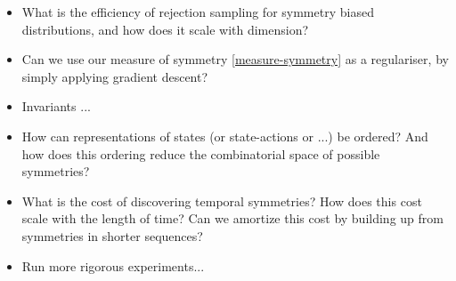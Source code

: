 \begin{itemize}
	\tightlist
	\item What is the efficiency of rejection sampling for symmetry biased distributions, and how does it scale with dimension?
	\item Can we use our measure of symmetry \ref{measure-symmetry} as a regulariser, by simply applying gradient descent?
	\item Invariants ...
	\item How can representations of states (or state-actions or ...) be ordered? And how does this ordering reduce the combinatorial space of possible symmetries?
	\item What is the cost of discovering temporal symmetries? How does this cost scale with the length of time? Can we amortize this cost by building up from symmetries in shorter
	sequences?
	\item Run more rigorous experiments...
\end{itemize}

